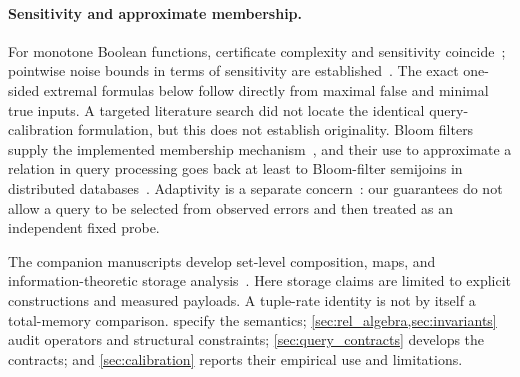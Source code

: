 \documentclass[../main.tex]{subfiles}
\begin{document}
\paragraph{Sensitivity and approximate membership.}
For monotone Boolean functions, certificate complexity and sensitivity
coincide~\cite{blanc2022counterfactuals}; pointwise noise bounds in terms of
sensitivity are established~\cite{gopalan2016smooth}. The exact one-sided
extremal formulas below follow directly from maximal false and minimal true
inputs. A targeted literature search did not locate the identical
query-calibration formulation, but this does not establish originality.
Bloom filters supply the implemented membership mechanism~\cite{bf}, and
their use to approximate a relation in query processing goes back at least
to Bloom-filter semijoins in distributed databases~\cite{mullin1990semijoins}.
Adaptivity is a separate concern~\cite{bender2017adaptivity}: our guarantees
do not allow a query to be selected from observed errors and then treated as
an independent fixed probe.

The companion manuscripts develop set-level composition, maps, and
information-theoretic storage analysis~\cite{bernoulliComposition,bernoulliMaps,bernoulliEntropy}.
Here storage claims are limited to explicit constructions and measured
payloads. A tuple-rate identity is not by itself a total-memory comparison.
 specify the semantics;
\cref{sec:rel_algebra,sec:invariants} audit operators and structural constraints;
\cref{sec:query_contracts} develops the contracts; and
\cref{sec:calibration} reports their empirical use and limitations.
\end{document}
